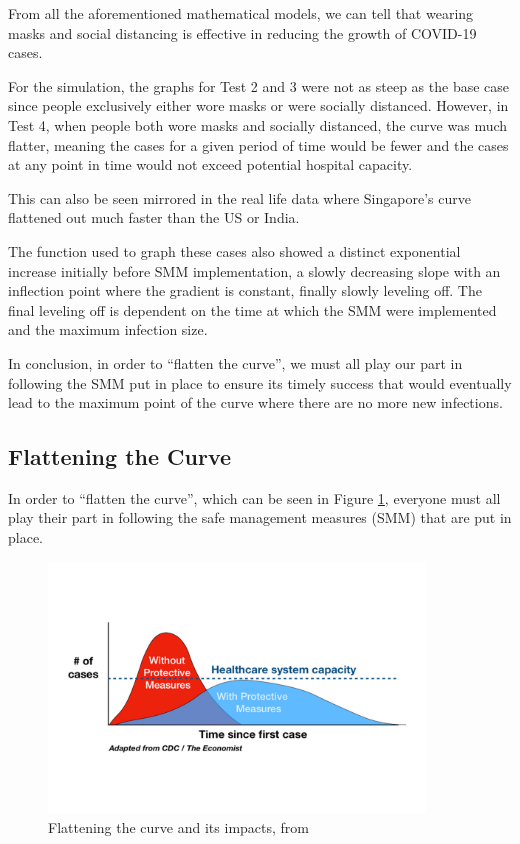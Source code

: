 \documentclass[a4paper,titlepage]{article}
\begin{document}
From all the aforementioned mathematical models, we can tell that wearing masks and social distancing is effective in reducing the growth of COVID-19 cases.

For the simulation, the graphs for Test 2 and 3 were not as steep as the base case since people exclusively either wore masks or were socially distanced. However, in Test 4, when people both wore masks and socially distanced, the curve was much flatter, meaning the cases for a given period of time would be fewer and the cases at any point in time would not exceed potential hospital capacity.

This can also be seen mirrored in the real life data where Singapore’s curve flattened out much faster than the US or India.

The function used to graph these cases also showed a distinct exponential increase initially before SMM implementation, a slowly decreasing slope with an inflection point where the gradient is constant, finally slowly leveling off. The final leveling off is dependent on the time at which the SMM were implemented and the maximum infection size.

In conclusion, in order to “flatten the curve”,  we must all play our part in following the SMM put in place to ensure its timely success that would eventually lead to the maximum point of the curve where there are no more new infections.

\subsection{Flattening the Curve}

In order to “flatten the curve”, which can be seen in Figure \ref{fig:flattenCurve}, everyone must all play their part in following the safe management measures (SMM) that are put in place.

\begin{figure}[htbp]
    \centering
    \includegraphics[width=10cm]{flattenCurve.jpg}
    \caption{Flattening the curve and its impacts, from \cite{flattencurve_roberts_2020}}
    \label{fig:flattenCurve}
\end{figure}
\end{document}
